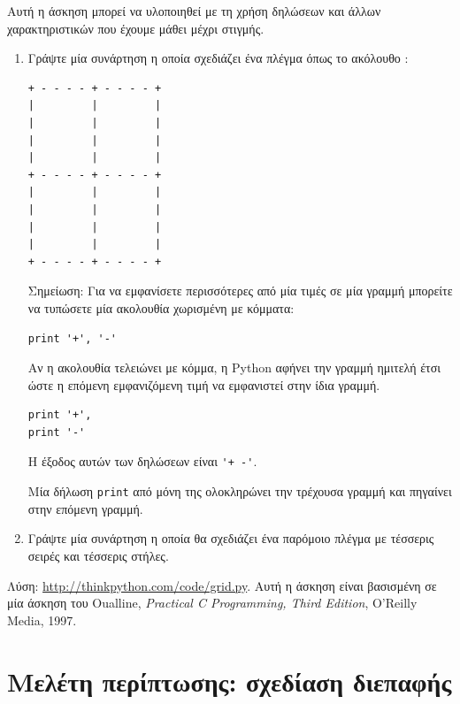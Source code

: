 \documentclass[10pt]{book}
\begin{document}
\begin{exercise}

Αυτή η άσκηση μπορεί να υλοποιηθεί με τη χρήση δηλώσεων και άλλων
χαρακτηριστικών που έχουμε μάθει μέχρι στιγμής.


\begin{enumerate}

\item Γράψτε μία συνάρτηση η οποία σχεδιάζει ένα πλέγμα όπως το ακόλουθο :


\begin{verbatim}
+ - - - - + - - - - +
|         |         |
|         |         |
|         |         |
|         |         |
+ - - - - + - - - - +
|         |         |
|         |         |
|         |         |
|         |         |
+ - - - - + - - - - +
\end{verbatim}
%

Σημείωση: Για να εμφανίσετε περισσότερες από μία τιμές σε μία γραμμή μπορείτε να τυπώσετε μία ακολουθία χωρισμένη με κόμματα:


\begin{verbatim}
print '+', '-'
\end{verbatim}
%

Αν η ακολουθία τελειώνει με κόμμα, η Python αφήνει την γραμμή ημιτελή 
έτσι ώστε η επόμενη εμφανιζόμενη τιμή να εμφανιστεί στην ίδια γραμμή.


\begin{verbatim}
print '+',
print '-'
\end{verbatim}
%

Η έξοδος αυτών των δηλώσεων είναι  \verb"'+ -'". 

Μία δήλωση {\tt print} από μόνη της ολοκληρώνει την τρέχουσα γραμμή
και πηγαίνει στην επόμενη γραμμή.

\item Γράψτε μία συνάρτηση η οποία θα σχεδιάζει ένα παρόμοιο πλέγμα
με τέσσερις σειρές και τέσσερις στήλες.


\end{enumerate}

Λύση:  \url{http://thinkpython.com/code/grid.py}. 
Αυτή η άσκηση είναι βασισμένη σε μία άσκηση του  Oualline,
{\em Practical C Programming, Third Edition}, O'Reilly Media, 1997.

\end{exercise}





\chapter{Μελέτη περίπτωσης: σχεδίαση διεπαφής}
\label{turtlechap}
\end{document}
